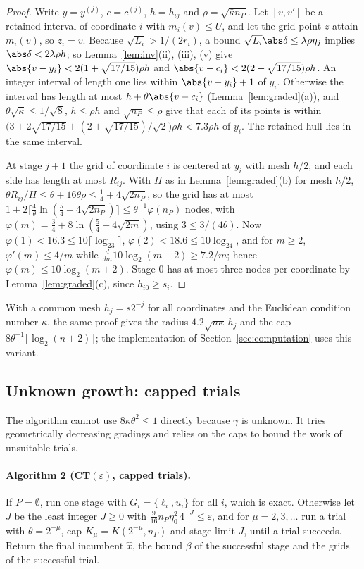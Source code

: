 \begin{proof}
Write $y=y^{(j)}$, $c=c^{(j)}$, $h=h_{ij}$ and $\rho=\sqrt{\bar\kappa n_P}$. Let
$[v,v']$ be a retained interval of coordinate $i$ with $m_i(v)\le U$, and let
the grid point $z$ attain $m_i(v)$, so $z_i=v$. Because $\sqrt{L_i}>1/(2r_i)$,
a bound $\sqrt{L_i}\abs\delta\le\lambda\rho\eta_j$ implies
$\abs\delta<2\lambda\rho h$; so Lemma~\ref{lem:inv}(ii), (iii), (v) give
$\abs{v-y_i}<2(1+\sqrt{17/15})\rho h$ and $\abs{v-c_i}<2(2+\sqrt{17/15})\rho h$.
An integer interval of length one lies within $\abs{v-y_i}+1$ of $y_i$.
Otherwise the interval has length at most $h+\theta\abs{v-c_i}$
(Lemma~\ref{lem:graded}(a)), and $\theta\sqrt{\bar\kappa}\le1/\sqrt8$, $h\le\rho h$
and $\sqrt{n_P}\le\rho$ give that each of its points is within
$\bigl(3+2\sqrt{17/15}+(2+\sqrt{17/15})/\sqrt2\bigr)\rho h<7.3\rho h$ of $y_i$.
The retained hull lies in the same interval.

At stage $j+1$ the grid of coordinate $i$ is centered at $y_i$ with mesh $h/2$,
and each side has length at most $R_{ij}$. With $H$ as in
Lemma~\ref{lem:graded}(b) for mesh $h/2$, $\theta R_{ij}/H\le\theta+16\theta\rho
\le\frac14+4\sqrt{2n_P}$, so the grid has at most
$1+2\lceil\frac4\theta\ln(\frac54+4\sqrt{2n_P})\rceil\le\theta^{-1}\varphi(n_P)$
nodes, with $\varphi(m)=\frac34+8\ln(\frac54+4\sqrt{2m})$, using $3\le3/(4\theta)$.
Now $\varphi(1)<16.3\le10\lceil\log_23\rceil$, $\varphi(2)<18.6\le10\log_24$, and
for $m\ge2$, $\varphi'(m)\le4/m$ while
$\frac{d}{dm}10\log_2(m+2)\ge7.2/m$; hence $\varphi(m)\le10\log_2(m+2)$. Stage
$0$ has at most three nodes per coordinate by Lemma~\ref{lem:graded}(c),
since $h_{i0}\ge s_i$.
\end{proof}

With a common mesh $h_j=s2^{-j}$ for all coordinates and the Euclidean
condition number $\kappa$, the same proof gives the radius
$4.2\sqrt{n\kappa}\,h_j$ and the cap $8\theta^{-1}\lceil\log_2(n+2)\rceil$;
the implementation of Section~\ref{sec:computation} uses this variant.


\subsection{Unknown growth: capped trials}
The algorithm cannot use $8\bar\kappa\theta^2\le1$ directly because $\gamma$ is
unknown. It tries geometrically decreasing gradings and relies on the caps to
bound the work of unsuitable trials.

\paragraph{Algorithm 2 (CT$(\varepsilon)$, capped trials).}
If $P=\emptyset$, run one stage with $G_i=\{\ell_i,u_i\}$ for all $i$, which is
exact. Otherwise let $J$ be the least integer $J\ge0$ with
$\frac9{16}n_P\eta_0^2\,4^{-J}\le\varepsilon$, and for $\mu=2,3,\dots$ run a trial
with $\theta=2^{-\mu}$, cap $K_\mu=K(2^{-\mu},n_P)$ and stage limit $J$, until a
trial succeeds. Return the final incumbent $\hat x$, the bound $\beta$ of the
successful stage and the grids of the successful trial.


